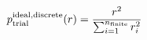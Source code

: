 \documentclass[12pt]{article}
\begin{document}
\begin{displaymath}
p_{\rm trial}^{\rm ideal,discrete}(r) = {{r^2}\over{\sum_{i=1}^{n_{\rm finite}} r_i^2}}
\end{displaymath}
\end{document}
